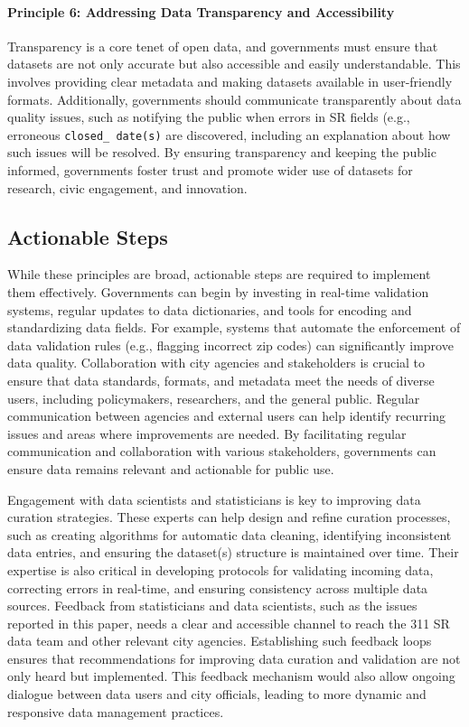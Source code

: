 \documentclass[linenumber]{jdsart}
\begin{document}
\paragraph{Principle 6: Addressing Data Transparency and Accessibility}
Transparency is a core tenet of open data, and governments must ensure 
that datasets are not only accurate but also accessible and easily 
understandable. This involves providing clear metadata and making 
datasets available in user-friendly formats. Additionally, 
governments should communicate transparently about 
data quality issues, such as notifying the public when errors in SR 
fields (e.g., erroneous \texttt{closed\_ date(s)} are discovered, including
an explanation about how such issues will be resolved. By 
ensuring transparency and keeping the public informed, 
governments foster trust and promote wider use of datasets 
for research, civic engagement, and innovation.


\subsection{Actionable Steps}
While these principles are broad, actionable steps are required to 
implement them effectively. Governments can begin by investing in 
real-time validation systems, regular updates to data dictionaries, 
and tools for encoding and standardizing data fields. For example, 
systems that automate the enforcement of data validation rules 
(e.g., flagging incorrect zip codes) can significantly improve data 
quality. Collaboration with city agencies and stakeholders is crucial 
to ensure that data standards, formats, and metadata meet the needs 
of diverse users, including policymakers, researchers, and the 
general public. Regular communication between agencies and external 
users can help identify recurring issues and areas where improvements 
are needed. By facilitating regular communication and collaboration 
with various stakeholders, governments can ensure data remains relevant 
and actionable for public use.


Engagement with data scientists and statisticians is key to improving 
data curation strategies. These experts can help design and refine 
curation processes, such as creating algorithms for automatic data 
cleaning, identifying inconsistent data entries, and ensuring the 
dataset(s) structure is maintained over time. Their expertise is also 
critical in developing protocols for validating incoming data, correcting 
errors in real-time, and ensuring consistency across multiple data sources. 
Feedback from statisticians and data scientists, such as the issues reported 
in this paper, needs a clear and accessible channel to reach the 311 SR data 
team and other relevant city agencies. Establishing such feedback loops 
ensures that recommendations for improving data curation and validation 
are not only heard but implemented. This feedback mechanism would also allow 
ongoing dialogue between data users and city officials, leading to more dynamic 
and responsive data management practices.
\end{document}
